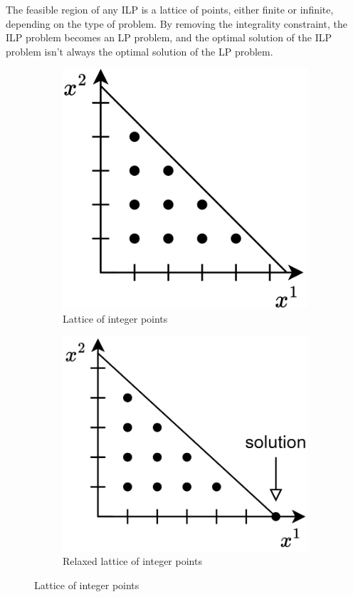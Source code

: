 The feasible region of any ILP is a lattice of points, either finite or infinite, depending on the type of problem.
By removing the integrality constraint, the ILP problem becomes an LP problem, and the optimal solution of the ILP problem isn't always the optimal solution of the LP problem.
\begin{figure}[H]
    \centering
    \begin{subfigure}[b]{0.495\textwidth}
        \centering
        \includegraphics[width=0.4\linewidth]{images/ilp.png}
        \caption{Lattice of integer points}
    \end{subfigure}
    \begin{subfigure}[b]{0.495\textwidth}
        \centering
        \includegraphics[width=0.4\linewidth]{images/ilp1.png}
        \caption{Relaxed lattice of integer points}
    \end{subfigure}
    \caption{Lattice of integer points}
\end{figure}
  
